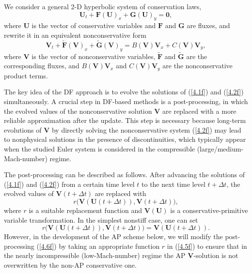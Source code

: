 \documentclass[preprint,12pt]{elsarticle}
\newcommand{\dt}{\Delta t}
\newcommand\eref[1]{(\ref{#1})}
\begin{document}
We consider a general 2-D hyperbolic system of conservation laws,
\begin{equation}
	\bm U_t+\bm F(\bm U)_x+\bm G(\bm U)_y=\bm0,
	\label{4.1f}
\end{equation}
where $\bm U$ is the vector of conservative variables and $\bm F$ and $\bm G$ are fluxes, and rewrite it in an equivalent nonconservative
form
\begin{equation}
	\bm V_t+\widetilde{\bm F}(\bm V)_x+\widetilde{\bm G}(\bm V)_y=B(\bm V)\bm V_x+C(\bm V)\bm V_y,
	\label{4.2f}
\end{equation}
where $\bm V$ is the vector of nonconservative variables, $\widetilde{\bm F}$ and $\widetilde{\bm G}$ are the corresponding fluxes, and
$B(\bm V)\bm V_x$ and $C(\bm V)\bm V_y$ are the nonconservative product terms.

The key idea of the DF approach is to evolve the solutions of \eref{4.1f} and \eref{4.2f} simultaneously. A crucial step in DF-based 
methods is a post-processing, in which the evolved values of the nonconservative solution $\bm V$ are replaced with a more reliable 
approximation after the update. This step is necessary because long-term evolutions of $\bm V$ by directly solving the nonconservative 
system \eref{4.2f} may lead to nonphysical solutions in the presence of discontinuities, which typically appear when the studied Euler 
system is considered in the compressible (large/medium-Mach-number) regime.

The post-processing can be described as follows. After advancing the solutions of \eref{4.1f} and \eref{4.2f} from a certain time level $t$
to the next time level $t+\dt$, the evolved values of $\bm V(t+\dt)$ are replaced with
\begin{equation}
	r\big(\bm V(\bm U(t+\dt)),\bm V(t+\dt)\big),
	\label{4.5f}
\end{equation}
where $r$ is a suitable replacement function and $\bm V(\bm U)$ is a conservative-primitive variable transformation. In the simplest
nonstiff case, one can set
\begin{equation}
	r\big(\bm V(\bm U(t+\dt)),\bm V(t+\dt)\big)=\bm V(\bm U(t+\dt)).
	\label{4.6f}
\end{equation}
However, in the development of the AP scheme below, we will modify the post-processing \eref{4.6f} by taking an appropriate function $r$ in
\eref{4.5f} to ensure that in the nearly incompressible (low-Mach-number) regime the AP $\bm V$-solution is not overwritten by the non-AP
conservative one.
\end{document}
